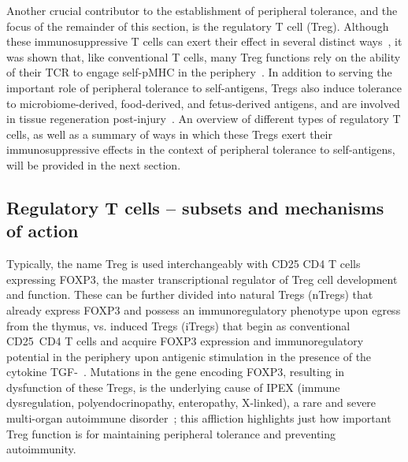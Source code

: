 Another crucial contributor to the establishment of peripheral tolerance, and the focus of the remainder of this section, is the regulatory T cell (Treg). Although these immunosuppressive T cells can exert their effect in several distinct ways~\cite{sakaguchi2008regulatory,shevyrev2020treg}, it was shown that, like conventional T cells, many Treg functions rely on the ability of their TCR to engage self-pMHC in the periphery~\cite{levine2014continuous,vahl2014continuous,schmidt2015regulatory}. In addition to serving the important role of peripheral tolerance to self-antigens, Tregs also induce tolerance to microbiome-derived, food-derived, and fetus-derived antigens, and are involved in tissue regeneration post-injury~\cite{xu2018c,zhang2001activation,burt2013fetal,shevyrev2020treg}. An overview of different types of regulatory T cells, as well as a summary of ways in which these Tregs exert their immunosuppressive effects in the context of peripheral tolerance to self-antigens, will be provided in the next section.

\subsection{Regulatory T cells -- subsets and mechanisms of action}
\label{sec:intro_autoimmunity_Tregs}

Typically, the name Treg is used interchangeably with CD25\pos{} CD4\pos{} T cells expressing FOXP3, the master transcriptional regulator of Treg cell development and function. These can be further divided into natural Tregs (nTregs) that already express FOXP3 and possess an immunoregulatory phenotype upon egress from the thymus, vs. induced Tregs (iTregs) that begin as conventional CD25\neg{}~CD4\pos{} T cells and acquire FOXP3 expression and immunoregulatory potential in the periphery upon antigenic stimulation in the presence of the cytokine TGF-\textbeta{}~\cite{chen2003conversion,sakaguchi2008regulatory}. Mutations in the gene encoding FOXP3, resulting in dysfunction of these Tregs, is the underlying cause of IPEX (immune dysregulation, polyendocrinopathy, enteropathy, X-linked), a rare and severe multi-organ autoimmune disorder~\cite{gambineri2003immune,agakidis2019immune}; this affliction highlights just how important Treg function is for maintaining peripheral tolerance and preventing autoimmunity.

